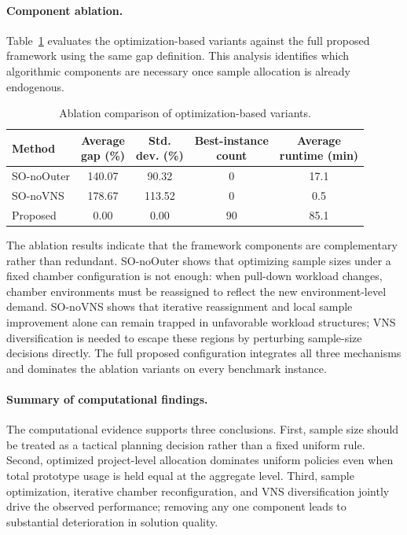 \documentclass[11pt]{article}
\begin{document}
\paragraph{Component ablation.}
Table~\ref{tab:ablation_comparison} evaluates the optimization-based variants against the full proposed framework using the same gap definition.
This analysis identifies which algorithmic components are necessary once sample allocation is already endogenous.
\begin{table}[H]
\centering
\caption{Ablation comparison of optimization-based variants.}
\label{tab:ablation_comparison}
\begin{tabular}{lcccc}
\hline
\textbf{Method}
& \shortstack{\textbf{Average}\\\textbf{gap (\%)}}
& \shortstack{\textbf{Std.}\\\textbf{dev. (\%)}}
& \shortstack{\textbf{Best-instance}\\\textbf{count}}
& \shortstack{\textbf{Average}\\\textbf{runtime (min)}} \\
\hline
SO-noOuter & 140.07 & 90.32 & 0 & 17.1 \\
SO-noVNS & 178.67 & 113.52 & 0 & 0.5 \\
Proposed & 0.00 & 0.00 & 90 & 85.1 \\
\hline
\end{tabular}
\end{table}
The ablation results indicate that the framework components are complementary rather than redundant.
SO-noOuter shows that optimizing sample sizes under a fixed chamber configuration is not enough: when pull-down workload changes, chamber environments must be reassigned to reflect the new environment-level demand.
SO-noVNS shows that iterative reassignment and local sample improvement alone can remain trapped in unfavorable workload structures; VNS diversification is needed to escape these regions by perturbing sample-size decisions directly.
The full proposed configuration integrates all three mechanisms and dominates the ablation variants on every benchmark instance.
\paragraph{Summary of computational findings.}
The computational evidence supports three conclusions.
First, sample size should be treated as a tactical planning decision rather than a fixed uniform rule.
Second, optimized project-level allocation dominates uniform policies even when total prototype usage is held equal at the aggregate level.
Third, sample optimization, iterative chamber reconfiguration, and VNS diversification jointly drive the observed performance; removing any one component leads to substantial deterioration in solution quality.
\end{document}
